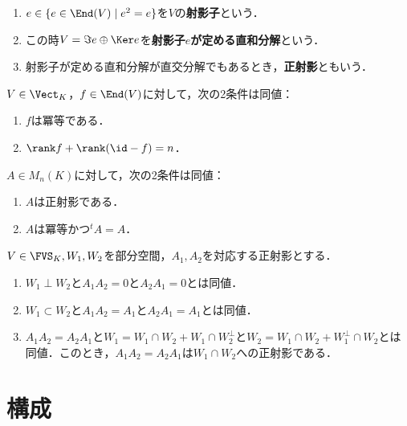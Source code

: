 \documentclass[uplatex, dvipdfmx]{jsreport}
\begin{document}
\begin{definition}[projector]\mbox{}
    \begin{enumerate}
        \item $e\in\{e\in\End(V)\mid e^2=e\}$を$V$の\textbf{射影子}という．
        \item この時$V=\Im e\oplus\Ker e$を\textbf{射影子$e$が定める直和分解}という．
        \item 射影子が定める直和分解が直交分解でもあるとき，\textbf{正射影}ともいう．
    \end{enumerate} 
\end{definition}

\begin{proposition}[冪等自己準同型の特徴付け]
    $V\in\Vect_K$，$f\in\End(V)$に対して，次の2条件は同値：
    \begin{enumerate}
        \item $f$は冪等である．
        \item $\rank f+\rank(\id-f)=n$．
    \end{enumerate}
\end{proposition}

\begin{proposition}[正射影の特徴付け]
    $A\in M_n(K)$に対して，次の2条件は同値：
    \begin{enumerate}
        \item $A$は正射影である．
        \item $A$は冪等かつ${}^t\!A=A$．
    \end{enumerate}
\end{proposition}

\begin{proposition}[部分空間の演算の正射影の演算への対応]
    $V\in\FVS_K,W_1,W_2$を部分空間，$A_1,A_2$を対応する正射影とする．
    \begin{enumerate}
        \item $W_1\perp W_2$と$A_1A_2=0$と$A_2A_1=0$とは同値．
        \item $W_1\subset W_2$と$A_1A_2=A_1$と$A_2A_1=A_1$とは同値．
        \item $A_1A_2=A_2A_1$と$W_1=W_1\cap W_2+W_1\cap W_2^\perp$と$W_2=W_1\cap W_2+W_1^\perp\cap W_2$とは同値．このとき，$A_1A_2=A_2A_1$は$W_1\cap W_2$への正射影である．
    \end{enumerate}
\end{proposition}

\section{構成}
\end{document}
